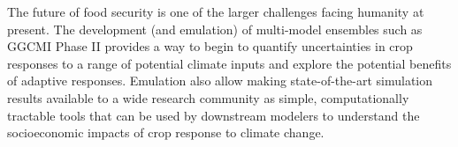 \documentclass[preprint, 5p, times, twocolumn]{elsarticle}
\begin{document}
The future of food security is one of the larger challenges facing humanity at present. The development (and emulation) of multi-model ensembles such as GGCMI Phase II provides a way to begin to quantify uncertainties in crop responses to a range of potential climate inputs and explore the potential benefits of adaptive responses. Emulation also allow making state-of-the-art simulation results available to a wide research community as simple, computationally tractable tools that can be used by downstream modelers to understand the socioeconomic impacts of crop response to climate change. 



\end{document}

